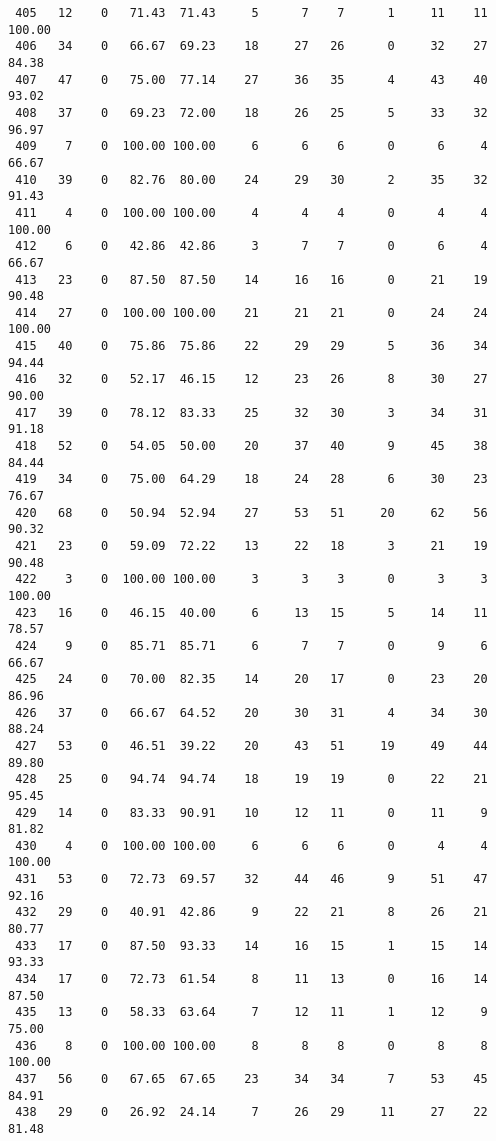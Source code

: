 \begin{verbatim}
 405   12    0   71.43  71.43     5      7    7      1     11    11   100.00
 406   34    0   66.67  69.23    18     27   26      0     32    27    84.38
 407   47    0   75.00  77.14    27     36   35      4     43    40    93.02
 408   37    0   69.23  72.00    18     26   25      5     33    32    96.97
 409    7    0  100.00 100.00     6      6    6      0      6     4    66.67
 410   39    0   82.76  80.00    24     29   30      2     35    32    91.43
 411    4    0  100.00 100.00     4      4    4      0      4     4   100.00
 412    6    0   42.86  42.86     3      7    7      0      6     4    66.67
 413   23    0   87.50  87.50    14     16   16      0     21    19    90.48
 414   27    0  100.00 100.00    21     21   21      0     24    24   100.00
 415   40    0   75.86  75.86    22     29   29      5     36    34    94.44
 416   32    0   52.17  46.15    12     23   26      8     30    27    90.00
 417   39    0   78.12  83.33    25     32   30      3     34    31    91.18
 418   52    0   54.05  50.00    20     37   40      9     45    38    84.44
 419   34    0   75.00  64.29    18     24   28      6     30    23    76.67
 420   68    0   50.94  52.94    27     53   51     20     62    56    90.32
 421   23    0   59.09  72.22    13     22   18      3     21    19    90.48
 422    3    0  100.00 100.00     3      3    3      0      3     3   100.00
 423   16    0   46.15  40.00     6     13   15      5     14    11    78.57
 424    9    0   85.71  85.71     6      7    7      0      9     6    66.67
 425   24    0   70.00  82.35    14     20   17      0     23    20    86.96
 426   37    0   66.67  64.52    20     30   31      4     34    30    88.24
 427   53    0   46.51  39.22    20     43   51     19     49    44    89.80
 428   25    0   94.74  94.74    18     19   19      0     22    21    95.45
 429   14    0   83.33  90.91    10     12   11      0     11     9    81.82
 430    4    0  100.00 100.00     6      6    6      0      4     4   100.00
 431   53    0   72.73  69.57    32     44   46      9     51    47    92.16
 432   29    0   40.91  42.86     9     22   21      8     26    21    80.77
 433   17    0   87.50  93.33    14     16   15      1     15    14    93.33
 434   17    0   72.73  61.54     8     11   13      0     16    14    87.50
 435   13    0   58.33  63.64     7     12   11      1     12     9    75.00
 436    8    0  100.00 100.00     8      8    8      0      8     8   100.00
 437   56    0   67.65  67.65    23     34   34      7     53    45    84.91
 438   29    0   26.92  24.14     7     26   29     11     27    22    81.48

\end{verbatim}
